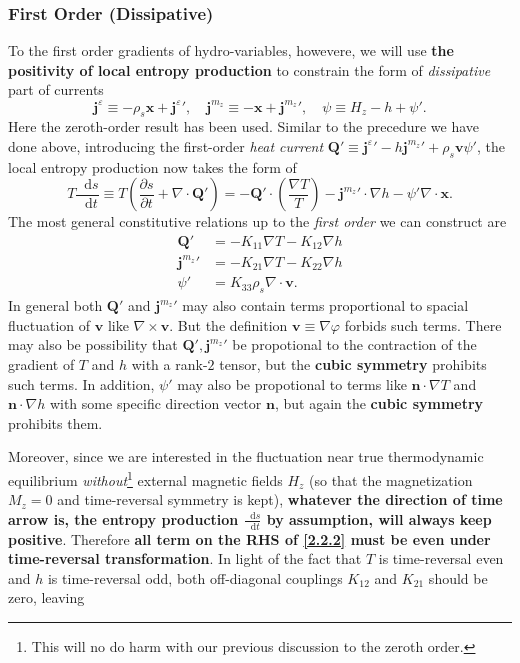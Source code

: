 \documentclass[10pt,nofootinbib]{revtex4}
\newcommand*\dd{\mathop{}\!\mathrm{d}}
\begin{document}
		\subsubsection{First Order (Dissipative)}
			To the first order gradients of hydro-variables, howevere, we will use {\bf the positivity of local entropy production} to constrain the form of \emph{dissipative} part of currents
			\begin{equation}\label{2.2.1}
				\bm{j}^\varepsilon\equiv-\rho_s\bm{x}+{\bm{j}^\varepsilon}',\quad\bm{j}^{m_z}\equiv-\bm{x}+{\bm{j}^{m_z}}',\quad \psi\equiv H_z-h+\psi'.
			\end{equation}
			Here the zeroth-order result has been used.	Similar to the precedure we have done above, introducing the first-order \emph{heat current} $\bm{Q'}\equiv{\bm{j}^\varepsilon}'-h{\bm{j}^{m_z}}'+\rho_s\bm{v}\psi'$, the local entropy production now takes the form of
			\begin{equation}\label{2.2.2}
				T\dfrac{\dd s}{\dd t}\equiv T \left(\dfrac{\partial s}{\partial t}+\nabla\cdot\bm{Q'}\right)=-\bm{Q'}\cdot\left(\dfrac{\nabla T}{T}\right)-{\bm{j}^{m_z}}'\cdot\nabla h-\psi'\nabla\cdot\bm{x}.
			\end{equation}
			The most general constitutive relations up to the \emph{first order} we can construct are
			\begin{align*}
				\bm{Q}'&=-K_{11}\nabla T-K_{12}\nabla h\\
				{\bm{j}^{m_z}}'&=-K_{21}\nabla T-K_{22}\nabla h\\
				\psi'&=K_{33}\rho_s\nabla\cdot\bm{v}.
			\end{align*}
			In general both $\bm{Q}'$ and ${\bm{j}^{m_z}}'$ may also contain terms proportional to spacial fluctuation of $\bm{v}$ like $\nabla\times\bm{v}$. But the definition $\bm{v}\equiv\nabla\varphi$ forbids such terms. There may also be possibility that $\bm{Q'},{\bm{j}^{m_z}}'$ be propotional to the contraction of the gradient of $T$ and $h$ with a rank-$2$ tensor, but the {\color{red}\textbf{cubic symmetry}} prohibits such terms. In addition, $\psi'$ may also be propotional to terms like $\bm{n}\cdot\nabla T$ and $\bm{n}\cdot\nabla h$ with some specific direction vector $\bm{n}$, but again the {\color{red}\textbf{cubic symmetry}} prohibits them.\par
			Moreover, since we are interested in the fluctuation near true thermodynamic equilibrium \emph{without}\footnote{This will no do harm with our previous discussion to the zeroth order.} external magnetic fields $H_z$ (so that the magnetization $M_z=0$ and time-reversal symmetry is kept), \textbf{\color{red} whatever the direction of time arrow is, the entropy production $\frac{\dd s}{\dd t}$ by assumption, will always keep positive}. Therefore \textbf{all term on the RHS of \eqref{2.2.2} must be even under time-reversal transformation}. In light of the fact that $T$ is time-reversal even and $h$ is time-reversal odd, both off-diagonal couplings $K_{12}$ and $K_{21}$ should be zero, leaving
\end{document}
